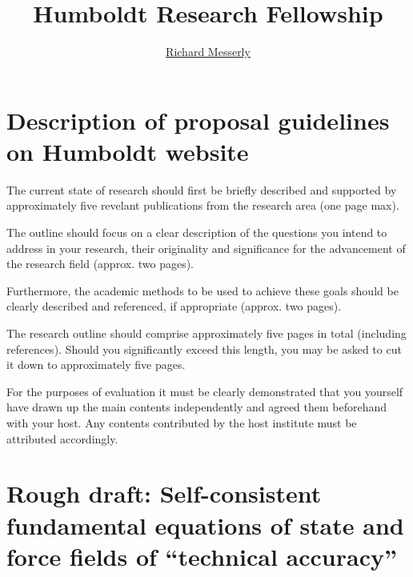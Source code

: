 \documentclass[11pt,a4paper]{article}
\begin{document}
	\thispagestyle{empty}
	\title{\Large \textbf{Humboldt Research Fellowship}}
	\author[1]{\large {\underline{Richard Messerly}}}%
	
	
	\date{} %
	\justify

\section*{Description of proposal guidelines on Humboldt website}

The current state of research should first be briefly described and supported by approximately five revelant publications from the research area (one page max).

The outline should focus on a clear description of the questions you intend to address in your research, their originality and significance for the advancement of the research field (approx. two pages).

Furthermore, the academic methods to be used to achieve these goals should be clearly described and referenced, if appropriate (approx. two pages).

The research outline should comprise approximately five pages in total (including references). Should you significantly exceed this length, you may be asked to cut it down to approximately five pages.

For the purposes of evaluation it must be clearly demonstrated that you yourself have drawn up the main contents independently and agreed them beforehand with your host. Any contents contributed by the host institute must be attributed accordingly.

\section*{Rough draft: Self-consistent fundamental equations of state and force fields of ``technical accuracy''}
\end{document}
